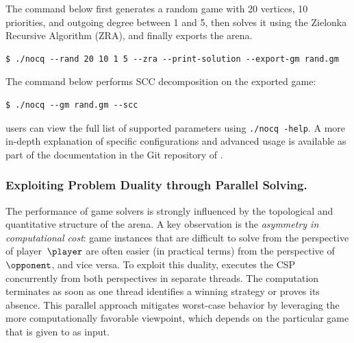 \documentclass[a4paper,UKenglish,cleveref, autoref, thm-restate, anonymous]{lipics-v2021}
\begin{document}
The command below first generates a random game with 20 vertices, 10 priorities, and outgoing degree between 1 and 5, then solves it using the Zielonka Recursive Algorithm (ZRA), and finally exports the arena.
\begin{lstlisting}
$ ./nocq --rand 20 10 1 5 --zra --print-solution --export-gm rand.gm
\end{lstlisting}


\noindent The command below performs SCC decomposition on the exported game:
\begin{lstlisting}
$ ./nocq --gm rand.gm --scc
\end{lstlisting}


\noindent \nocq users can view the full list of supported parameters using \texttt{./nocq -\-help}. A more in-depth explanation of specific configurations and advanced usage is available as part of the documentation in the Git repository of \nocq. 

\subsubsection{Exploiting Problem Duality through Parallel Solving.}

The performance of game solvers is strongly influenced by the topological and quantitative structure of the arena. A key observation is the \emph{asymmetry in computational cost}: game instances that are difficult to solve from the perspective of player~$\player$ are often easier (in practical terms) from the perspective of $\opponent$, and vice versa.
%
To exploit this duality, \nocq executes the CSP concurrently from both perspectives in separate threads. The computation terminates as soon as one thread identifies a winning strategy or proves its absence. This parallel approach mitigates worst-case behavior by leveraging the more computationally favorable viewpoint, which depends on the particular game that is given to \nocq as input. 
\end{document}
